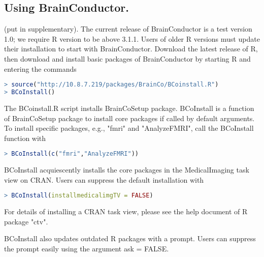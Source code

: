 \documentclass{nature}
\begin{document}
\begin{methods}


\subsection{Using BrainConductor.} 
(put in supplementary). The current release of BrainConductor is a test version 1.0; we require R version to be above 3.1.1. Users of older R versions must update their installation to start with BrainConductor. Download the latest release of R, then download and install basic packages of BrainConductor by starting R and entering the commands
\begin{lstlisting}[language = R]
> source("http://10.8.7.219/packages/BrainCo/BCoinstall.R")
> BCoInstall()
\end{lstlisting}
The BCoinstall.R script installs BrainCoSetup package. BCoInstall is a function of BrainCoSetup package to install core packages if called by default arguments. To install specific packages, e.g., "fmri" and "AnalyzeFMRI", call the BCoInstall function with
\begin{lstlisting}[language = R]
> BCoInstall(c("fmri","AnalyzeFMRI"))
\end{lstlisting}
BCoInstall acquiescently installs the core packages in the MedicalImaging task view on CRAN. Users can suppress the default installation with
\begin{lstlisting}[language = R]
> BCoInstall(installmedicalimgTV = FALSE)
\end{lstlisting}
For details of installing a CRAN task view, please see the help document of R package "ctv".   

BCoInstall also updates outdated R packages with a prompt. Users can suppress the prompt easily using the argument ask = FALSE. 


\end{methods}
\end{document}
